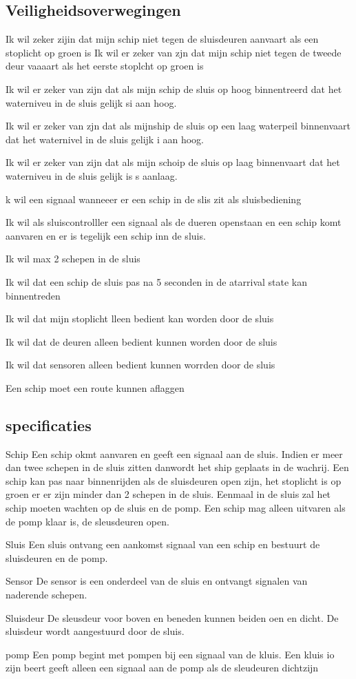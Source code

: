 \subsection{Veiligheidsoverwegingen}

Ik wil zeker zijin dat mijn schip niet tegen de sluisdeuren aanvaart als een stoplicht op groen is
Ik wil er zeker van zjn dat mijn schip niet tegen de tweede deur vaaaart als het eerste stoplcht op groen is

Ik wil er zeker van zijn dat als mijn schip de sluis op hoog binnentreerd dat het waterniveu in de sluis gelijk si aan hoog.

Ik wil er zeker van zjn dat als mijnship de sluis op een laag waterpeil binnenvaart dat het waternivel in de sluis gelijk i aan hoog.

Ik wil er zeker van zijn dat als mijn schoip de sluis op laag binnenvaart dat het waterniveu in de sluis gelijk is s aanlaag.

k wil een signaal wanneeer er een schip in de slis zit als sluisbediening

Ik wil als sluiscontrolller een signaal als de dueren openstaan en een schip komt aanvaren en er is tegelijk een schip inn de sluis.

Ik wil max 2 schepen in de sluis

Ik wil dat een schip de sluis pas na 5 seconden in de  atarrival state kan binnentreden

Ik wil dat mijn stoplicht lleen bedient kan worden door de sluis

Ik wil dat de deuren alleen bedient kunnen worden door de sluis


Ik wil dat sensoren alleen bedient kunnen worrden door de sluis

Een schip moet een route kunnen aflaggen 






\subsection{specificaties}
\par{Schip}
Een schip okmt aanvaren en geeft een signaal aan de sluis. Indien er meer dan twee schepen in de sluis zitten danwordt het ship geplaats in de wachrij. Een schip kan pas naar binnenrijden als de sluisdeuren open zijn, het stoplicht is op groen er er zijn minder dan 2 schepen in de sluis. Eenmaal in de sluis zal het schip moeten wachten op de sluis en de pomp. Een schip mag alleen uitvaren als de pomp klaar is, de sleusdeuren open.
\par{Sluis}
Een sluis ontvang een aankomst signaal van een schip en bestuurt de sluisdeuren en de pomp.
\par{Sensor}
De sensor is een onderdeel van de sluis en ontvangt signalen van naderende schepen.
\par{Sluisdeur}
De sleusdeur voor boven en beneden kunnen beiden oen en dicht. De sluisdeur wordt aangestuurd door de sluis.
\par{pomp}
Een pomp begint met pompen bij een signaal van de kluis. Een kluis io zijn beert geeft alleen een signaal aan de pomp als de sleudeuren dichtzijn

